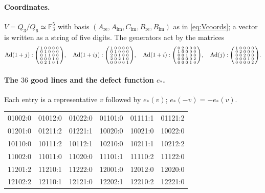 \documentclass[11pt]{article}
\newcommand{\Fq}{\mathbb F}
\newcommand{\Ad}{\operatorname{Ad}}
\theoremstyle{plain}
\theoremstyle{definition}
\begin{document}
\paragraph{Coordinates.}  $V=Q_3/Q_6\simeq\Fq_3^5$ with basis
$(A_{\mathrm{re}},A_{\mathrm{im}},C_{\mathrm{im}},B_{\mathrm{re}},B_{\mathrm{im}})$
as in \eqref{eq:Vcoords}; a vector is written as a string of five
digits.  The generators act by the matrices
\[
\Ad(1+j):\begin{psmallmatrix}1&0&0&0&0\\0&1&0&0&0\\0&1&1&0&0\\0&0&0&1&0\\0&2&1&0&1\end{psmallmatrix},\quad
\Ad(1+ij):\begin{psmallmatrix}1&0&0&0&0\\0&1&0&0&0\\2&0&1&0&0\\2&0&2&1&0\\0&0&0&0&1\end{psmallmatrix},\quad
\Ad(1+i):\begin{psmallmatrix}0&2&0&0&0\\1&0&0&0&0\\0&0&1&0&0\\0&0&0&0&2\\0&0&0&1&0\end{psmallmatrix},\quad
\Ad(j):\begin{psmallmatrix}1&0&0&0&0\\0&2&0&0&0\\0&0&2&0&0\\0&0&0&1&0\\0&0&0&0&2\end{psmallmatrix}.
\]
\paragraph{The $36$ good lines and the defect function $e_*$.}
Each entry is a representative $v$ followed by $e_*(v)$; $e_*(-v)=-e_*(v)$.
\begin{center}\small\ttfamily
\begin{tabular}{llllll}
01002:0&01012:0&01022:0&01101:0&01111:1&01121:2\\
01201:0&01211:2&01221:1&10020:0&10021:0&10022:0\\
10110:0&10111:2&10112:1&10210:0&10211:1&10212:2\\
11002:0&11011:0&11020:0&11101:1&11110:2&11122:0\\
11201:2&11210:1&11222:0&12001:0&12012:0&12020:0\\
12102:2&12110:1&12121:0&12202:1&12210:2&12221:0\\
\end{tabular}
\end{center}
\end{document}
